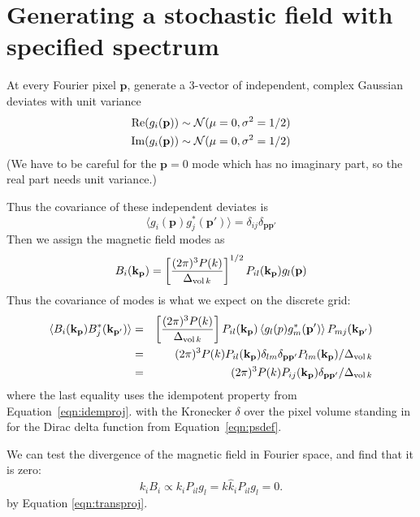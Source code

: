 \documentclass{article}
\begin{document}
\section{Generating a stochastic field with specified spectrum}

At every Fourier pixel $\mathbf{p}$, generate a 3-vector of independent, complex Gaussian deviates with unit variance
\begin{eqnarray}
  {\rm Re}(g_i(\mathbf{p})) \sim {\cal N}(\mu = 0, \sigma^2 = 1/2) \\ \nonumber
  {\rm Im}(g_i(\mathbf{p})) \sim {\cal N}(\mu = 0, \sigma^2 = 1/2)  
\end{eqnarray}
(We have to be careful for the $\mathbf{p} = 0$ mode which has no imaginary part, so the real part needs unit variance.)

Thus the covariance of these independent deviates is
\begin{equation}
  \langle g_i(\mathbf{p}) g_j^*(\mathbf{p}') \rangle = \delta_{ij} \delta_\mathbf{pp'}
\end{equation}
Then we assign the magnetic field modes as
\begin{equation}
  B_i (\mathbf{k_p}) = \left[ \frac{(2\pi)^3 P(k)}{\Delta_{{\rm vol}\,k}} \right]^{1/2} P_{il}(\mathbf{k_p}) g_l(\mathbf{p})
\end{equation}
Thus the covariance of modes is what we expect on the discrete grid:
\begin{eqnarray}
  \langle B_i(\mathbf{k_p}) B^*_j(\mathbf{k_{p'}}) \rangle &=&   \left[ \frac{(2\pi)^3 P(k)}{\Delta_{{\rm vol}\,k}} \right] P_{il}(\mathbf{k_p}) \left\langle g_l(p) g^*_m(\mathbf{p'}) \right\rangle P_{mj}(\mathbf{k_{p'}}) \\ \nonumber
  &=&   {(2\pi)^3 P(k)}  P_{il}(\mathbf{k_p}) \delta_{lm} \delta_{\mathbf{pp}'} P_{lm}(\mathbf{k_p})/{\Delta_{{\rm vol}\,k}} \\ \nonumber
  &=&  {(2\pi)^3 P(k)}  P_{ij}(\mathbf{k_p}) \delta_{\mathbf{pp}'}/{\Delta_{{\rm vol}\,k}}
\end{eqnarray}
where the last equality uses the idempotent property from Equation~\ref{eqn:idemproj}.
with the Kronecker $\delta$ over the pixel volume standing in for the Dirac delta function from Equation~\ref{eqn:psdef}.

We can test the divergence of the magnetic field in Fourier space, and find that it is zero:
\begin{equation}
  k_i B_i \propto k_i P_{il} g_l = k \hat k_i P_{il} g_l = 0.
\end{equation}
by Equation \ref{eqn:transproj}.
\end{document}
